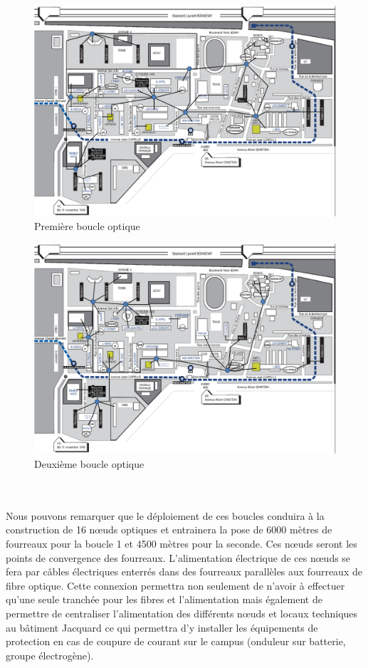 \begin{figure}[h]
  \caption{\label{Plan_boucle1} Première boucle optique}
  \includegraphics[scale=0.6]{Boucle1.png}
\end{figure}

\begin{figure}[h]
  \caption{\label{Plan_boucle2} Deuxième boucle optique}
  \includegraphics[scale=0.6]{Boucle2.png}
\end{figure}
~\\

\paragraph{} Nous pouvons remarquer que le déploiement de ces boucles conduira à la construction de 16 nœuds optiques et entrainera la pose de 6000 mètres de fourreaux pour la boucle 1 et 4500 mètres pour la seconde. Ces nœuds seront les points de convergence des fourreaux. L'alimentation électrique de ces nœuds se fera par câbles électriques enterrés dans des fourreaux parallèles aux fourreaux de fibre optique. Cette connexion permettra non seulement de n'avoir à effectuer qu'une seule tranchée pour les fibres et l'alimentation mais également de permettre de centraliser l'alimentation des différents nœuds et locaux techniques au bâtiment Jacquard ce qui permettra d'y installer les équipements de protection en cas de coupure de courant sur le campus (onduleur sur batterie, groupe électrogène).

